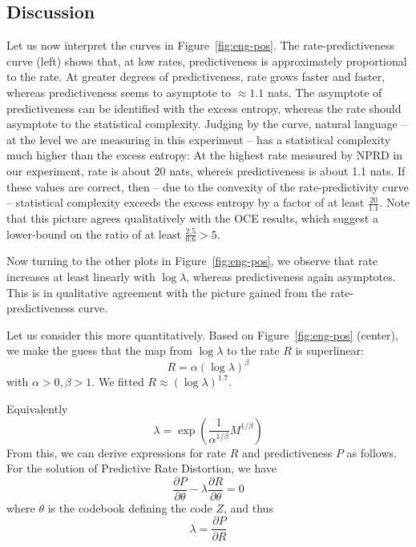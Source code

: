 \documentclass[11pt,letterpaper]{article}
\begin{document}
\subsection{Discussion}
Let us now interpret the curves in Figure~\ref{fig:eng-pos}.
The rate-predictiveness curve (left) shows that, at low rates, predictiveness is approximately proportional to the rate.
At greater degrees of predictiveness, rate grows faster and faster, whereas predictiveness seems to asymptote to $\approx 1.1$ nats.
The asymptote of predictiveness can be identified with the excess entropy, whereas the rate should asymptote to the statistical complexity.
Judging by the curve, natural language -- at the level we are measuring in this experiment -- has a statistical complexity much higher than the excess entropy:
At the highest rate measured by NPRD in our experiment, rate is about 20 nats, whereis predictiveness is about 1.1 nats.
If these values are correct, then -- due to the convexity of the rate-predictivity curve -- statistical complexity exceeds the excess entropy by a factor of at least $\frac{20}{1.1}$.
Note that this picture agrees qualitatively with the OCE results, which suggest a lower-bound on the ratio of at least $\frac{2.5}{0.6} > 5$.

Now turning to the other plots in Figure~\ref{fig:eng-pos}, we observe that rate increases at least linearly with $\log\lambda$, whereas predictiveness again asymptotes.
This is in qualitative agreement with the picture gained from the rate-predictiveness curve.


Let us consider this more quantitatively.
Based on Figure~\ref{fig:eng-pos} (center), we make the guess that the map from $\log\lambda$ to the rate $R$ is superlinear:
\begin{equation}
	R = \alpha (\log\lambda)^\beta
\end{equation}
	with $\alpha>0, \beta>1$.
We fitted $R \approx (\log\lambda)^{1.7}$.

Equivalently
\begin{equation}
\lambda = \exp\left(\frac{1}{\alpha^{1/\beta}} M^{1/\beta}\right)
\end{equation}
From this, we can derive expressions for rate $R$ and predictiveness $P$ as follows.
For the solution of Predictive Rate Distortion, we have
\begin{equation}
	\frac{\partial P}{\partial \theta} - \lambda \frac{\partial R}{\partial \theta} = 0
\end{equation}
where $\theta$ is the codebook defining the code $Z$, and thus
\begin{equation}
\lambda =	\frac{\partial P}{\partial R}
\end{equation}
\end{document}
